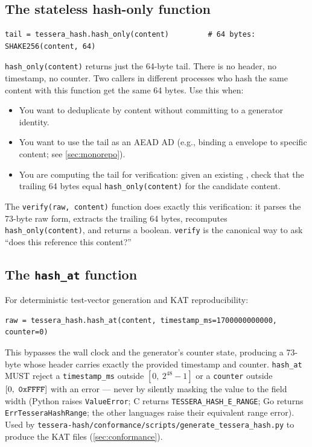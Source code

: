 \subsection{The stateless hash-only function}

\begin{lstlisting}[language=Pseudocode]
tail = tessera_hash.hash_only(content)         # 64 bytes: SHAKE256(content, 64)
\end{lstlisting}

\texttt{hash\_only(content)} returns just the 64-byte tail. There is no header, no timestamp, no counter. Two callers in different processes who hash the same content with this function get the same 64 bytes. Use this when:
\begin{itemize}
\item You want to deduplicate by content without committing to a generator identity.
\item You want to use the tail as an AEAD AD (e.g., binding a \tesseraseal{} envelope to specific content; see \cref{sec:monorepo}).
\item You are computing the tail for verification: given an existing \tesserahash{}, check that the trailing 64 bytes equal \texttt{hash\_only(content)} for the candidate content.
\end{itemize}

The \texttt{verify(raw, content)} function does exactly this verification: it parses the 73-byte raw form, extracts the trailing 64 bytes, recomputes \texttt{hash\_only(content)}, and returns a boolean. \texttt{verify} is the canonical way to ask ``does this \tesserahash{} reference this content?''

\subsection{The \texttt{hash\_at} function}

For deterministic test-vector generation and KAT reproducibility:

\begin{lstlisting}[language=Pseudocode]
raw = tessera_hash.hash_at(content, timestamp_ms=1700000000000, counter=0)
\end{lstlisting}

This bypasses the wall clock and the generator's counter state, producing a 73-byte \tesserahash{} whose header carries exactly the provided timestamp and counter. \texttt{hash\_at} MUST reject a \texttt{timestamp\_ms} outside $[0,\ 2^{48}-1]$ or a \texttt{counter} outside $[0,\ \code{0xFFFF}]$ with an error --- never by silently masking the value to the field width (Python raises \texttt{ValueError}; C returns \texttt{TESSERA\_HASH\_E\_RANGE}; Go returns \texttt{ErrTesseraHashRange}; the other languages raise their equivalent range error). Used by \texttt{tessera-hash/conformance/scripts/generate\_tessera\_hash.py} to produce the KAT files (\cref{sec:conformance}).

